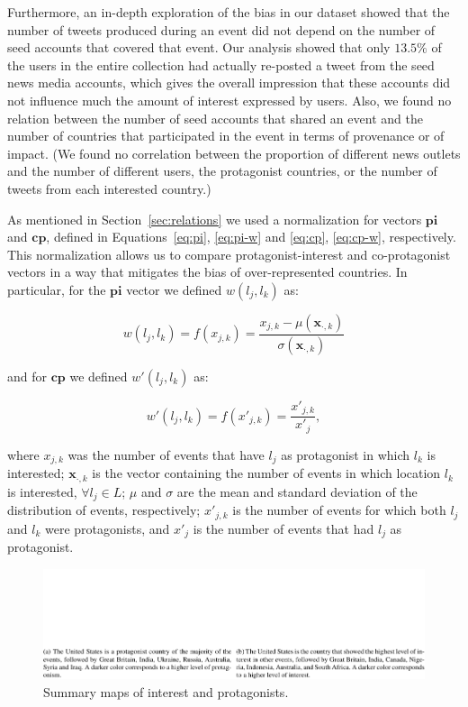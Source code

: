 
Furthermore, an in-depth exploration of the bias in our dataset showed that the
number of tweets produced during an event did not depend on the number of seed
accounts that covered that event. 
%
Our analysis showed that only $13.5\%$ of the users in the entire collection had
actually re-posted a tweet from the seed news media accounts, which gives the
overall impression that these accounts did not influence much the amount of
interest expressed by users. 
%
Also, we found no relation between the number of seed accounts that shared an event
and the number of countries that participated in the event in terms of
provenance or of impact. 
%
(We found no correlation between the proportion of different news
outlets and the number of different users, the protagonist countries, or the
number of tweets from each interested country.)


As mentioned in Section~\ref{sec:relations} we used a normalization for vectors
$\mathbf{pi}$ and $\mathbf{cp}$, defined in Equations~\ref{eq:pi}, \ref{eq:pi-w}
and \ref{eq:cp}, \ref{eq:cp-w}, respectively. 
%
This normalization allows us to compare protagonist-interest and co-protagonist
vectors in a way that mitigates the bias of over-represented countries. 
%
In particular, for the $\mathbf{pi}$ vector we defined $w(l_j,l_k)$ as:

$$w(l_j, l_k) = f(x_{j,k})= \frac{x_{j,k} - \mu(\mathbf{x}_{\cdot,k})}{\sigma(\mathbf{x}_{\cdot,k})}$$

\noindent and for $\mathbf{cp}$ we defined $w'(l_j,l_k)$ as:

$$w'(l_j, l_k) = f(x'_{j,k})= \frac{x'_{j,k}}{x'_{j}},$$

\noindent where $x_{j,k}$ was the number of events that have $l_j$ as
protagonist in which $l_k$ is interested; $\mathbf{x}_{\cdot,k}$ is the vector
containing the number of events in which location $l_k$ is interested, $\forall
l_j \in L$; $\mu$ and $\sigma$ are the mean and standard deviation of the
distribution of events, respectively; $x'_{j,k}$ is the number of events for
which both $l_j$ and $l_k$ were protagonists, and $x'_{j}$ is the number of
events that had $l_j$ as protagonist.

\begin{figure}[t]
\centering
\includegraphics[width=\textwidth]{figures/geopolitical/choropleths.pdf}
\caption{Summary maps of interest and protagonists.}\label{fig:maps}
\end{figure}

